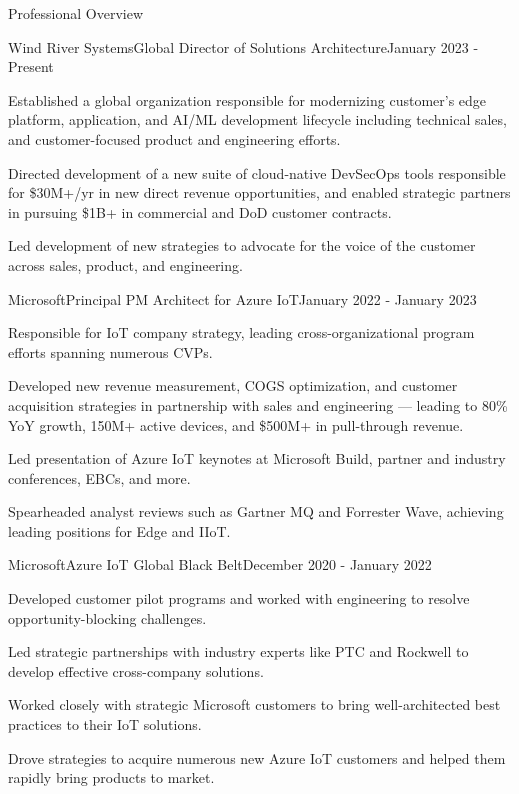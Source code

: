 \documentclass{resume} %
\begin{document}
\begin{rSection}{Professional Overview}
  
  \begin{rNewRole}{Wind River Systems}{Global Director of Solutions Architecture}{January 2023 - Present}
    \item Established a global organization responsible for modernizing customer's edge platform, application, and AI/ML development lifecycle including technical sales, and customer-focused product and engineering efforts.
    \item Directed development of a new suite of cloud-native DevSecOps tools responsible for \$30M+/yr in new direct revenue opportunities, and enabled strategic partners in pursuing \$1B+ in commercial and DoD customer contracts.
    \item Led development of new strategies to advocate for the voice of the customer across sales, product, and engineering.
  \end{rNewRole}

  \begin{rNewRole}{Microsoft}{Principal PM Architect for Azure IoT}{January 2022 - January 2023}
      
    \item Responsible for IoT company strategy, leading cross-organizational program efforts spanning numerous CVPs.
    \item Developed new revenue measurement, COGS optimization, and customer acquisition strategies in partnership with sales and engineering --- leading to 80\% YoY growth, 150M+ active devices, and \$500M+ in pull-through revenue.
    \item Led presentation of Azure IoT keynotes at Microsoft Build, partner and industry conferences, EBCs, and more.
    \item Spearheaded analyst reviews such as Gartner MQ and Forrester Wave, achieving leading positions for Edge and IIoT.
    
  \end{rNewRole}

  \begin{rNewRole}{Microsoft}{Azure IoT Global Black Belt}{December 2020 - January 2022}
      
    \item Developed customer pilot programs and worked with engineering to resolve opportunity-blocking challenges.  
    \item Led strategic partnerships with industry experts like PTC and Rockwell to develop effective cross-company solutions.
    \item Worked closely with strategic Microsoft customers to bring well-architected best practices to their IoT solutions.
    \item Drove strategies to acquire numerous new Azure IoT customers and helped them rapidly bring products to market.
    

\end{rNewRole}
\end{rSection}
\end{document}
